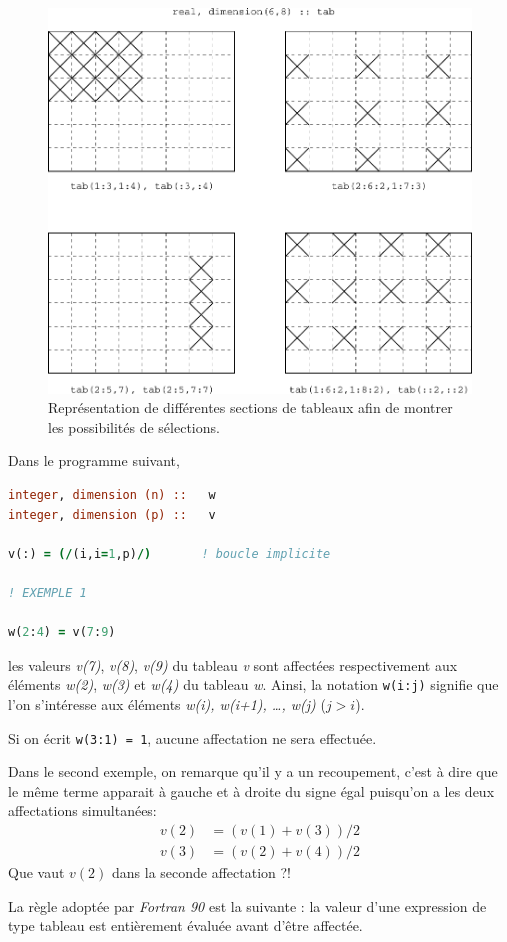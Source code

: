 \documentclass[a4paper,twoside]{article}
\begin{document}
\begin{figure}[htb]
\centering
\includegraphics[width=0.65\linewidth]{figure/sections_de_tableaux.pdf}
\caption{Représentation de différentes sections de tableaux afin de montrer les possibilités de sélections.}
\end{figure}

Dans le programme suivant,
\begin{lstlisting}[language=Fortran]
integer, dimension (n) ::   w
integer, dimension (p) ::   v

v(:) = (/(i,i=1,p)/)       ! boucle implicite

! EXEMPLE 1

w(2:4) = v(7:9)
\end{lstlisting}
les valeurs  \emph{v(7)}, \emph{v(8)}, \emph{v(9)} du tableau \emph{v} sont affectées respectivement aux éléments \emph{w(2)}, \emph{w(3)} et \emph{w(4)} du tableau \emph{w}. Ainsi, la notation \texttt{w(i:j)} signifie que l'on s'intéresse aux éléments \emph{w(i), w(i+1), \ldots, w(j)} ($j>i$). 

\begin{remarque}
Si on écrit \texttt{w(3:1) = 1}, aucune affectation ne sera effectuée.
\end{remarque}

Dans le second exemple, on remarque qu'il y a un recoupement, c'est à dire que le même terme apparait à gauche et à droite du signe égal puisqu'on a les deux affectations \og simultanées\fg :
\begin{align*}
v(2) &= (v(1)+v(3))/2\\
v(3) &= (v(2)+v(4))/2
\end{align*}
Que vaut $v(2)$ dans la seconde affectation ?! 

\begin{important}
La règle adoptée par \emph{Fortran 90} est la suivante : la valeur d'une expression de type tableau est entièrement évaluée avant d'être affectée. 
\end{important}
\end{document}

